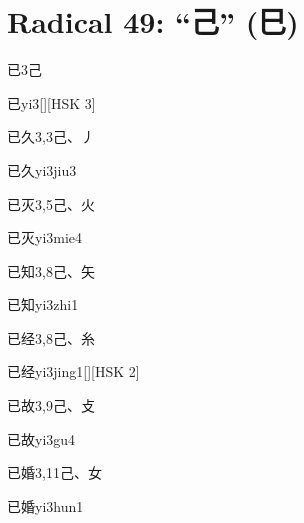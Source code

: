 
\section*{Radical 49: ``⼰'' (⺒)}

\begin{entry}{已}{3}{⼰}
  \begin{phonetics}{已}{yi3}[][HSK 3]
  \end{phonetics}
\end{entry}

\begin{entry}{已久}{3,3}{⼰、⼃}
  \begin{phonetics}{已久}{yi3jiu3}
  \end{phonetics}
\end{entry}

\begin{entry}{已灭}{3,5}{⼰、⽕}
  \begin{phonetics}{已灭}{yi3mie4}
  \end{phonetics}
\end{entry}

\begin{entry}{已知}{3,8}{⼰、⽮}
  \begin{phonetics}{已知}{yi3zhi1}
  \end{phonetics}
\end{entry}

\begin{entry}{已经}{3,8}{⼰、⽷}
  \begin{phonetics}{已经}{yi3jing1}[][HSK 2]
  \end{phonetics}
\end{entry}

\begin{entry}{已故}{3,9}{⼰、⽁}
  \begin{phonetics}{已故}{yi3gu4}
  \end{phonetics}
\end{entry}

\begin{entry}{已婚}{3,11}{⼰、⼥}
  \begin{phonetics}{已婚}{yi3hun1}
  \end{phonetics}
\end{entry}

